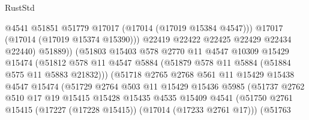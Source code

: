 \begin{lexlean}{RustStd}
\begin{coremodule}
                                      @4541
                                      @51851
                                      @51779
                                      @17017
                                      (@17014 (@17019 @15384 @4547)))
                                    @17017
                                    (@17014 (@17019 @15374 @15390)))
                                  @22419
                                  @22422
                                  @22425
                                  @22429
                                  @22434
                                  @22440)
                                @51889))
                            (@51803
                              @15403
                              @578
                              @2770
                              @11
                              @4547
                              @10309
                              @15429
                              @15474
                              (@51812
                                @578
                                @11
                                @4547
                                @5884
                                (@51879 @578 @11 @5884 (@51884 @575 @11 @5883 @21832)))
                              (@51718
                                @2765
                                @2768
                                @561
                                @11
                                @15429
                                @15438
                                @4547
                                @15474
                                (@51729
                                  @2764
                                  @503
                                  @11
                                  @15429
                                  @15436
                                  @5985
                                  (@51737
                                    @2762
                                    @510
                                    @17
                                    @19
                                    @15415
                                    @15428
                                    @15435
                                    @4535
                                    @15409
                                    @4541
                                    (@51750
                                      @2761
                                      @15415
                                      (@17227 (@17228 @15415))
                                      (@17014 (@17233 @2761 @17)))
                                    (@51763

\end{coremodule}
\end{lexlean}
